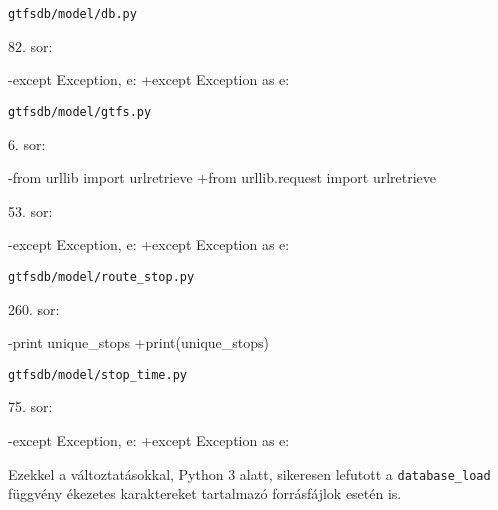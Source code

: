 \bigskip

\noindent \texttt{gtfsdb/model/db.py}

82. sor:
\begin{python}
-except Exception, e:
+except Exception as e:
\end{python}

\bigskip

\noindent \texttt{gtfsdb/model/gtfs.py}

6. sor:
\begin{python}
-from urllib import urlretrieve
+from urllib.request import urlretrieve
\end{python}

53. sor:
\begin{python}
-except Exception, e:
+except Exception as e:
\end{python}

\newpage

\noindent \texttt{gtfsdb/model/route\_stop.py}

260. sor:
\begin{python}
-print unique_stops
+print(unique_stops)
\end{python}

\bigskip

\noindent \texttt{gtfsdb/model/stop\_time.py}

75. sor:
\begin{python}
-except Exception, e:
+except Exception as e:
\end{python}


Ezekkel a változtatásokkal, Python 3 alatt, sikeresen lefutott a \texttt{database\_load} függvény ékezetes karaktereket tartalmazó forrásfájlok esetén is.
